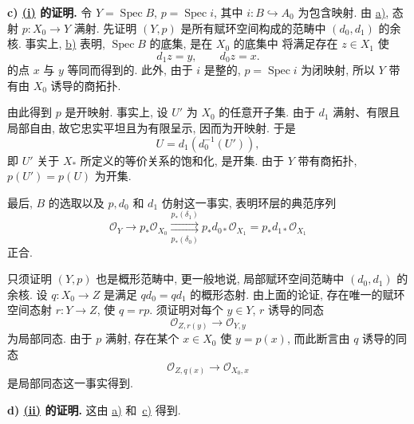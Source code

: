 
\medskip
{}\label{proof:sga3-V-4.1-c}%
\noindent\textbf{c) \hyperref[thm:sga3-V-4.1-i]{(i)} 的证明.}
令 \(Y=\operatorname{Spec}B\), \(p=\operatorname{Spec}i\),
其中 \(i:B\hookrightarrow A_0\) 为包含映射.
由 \hyperref[proof:sga3-V-4.1-a]{a)}, 态射 \(p:X_0\to Y\) 满射.
先证明 \((Y,p)\) 是所有赋环空间构成的范畴中 \((d_0,d_1)\) 的余核.
事实上, \hyperref[proof:sga3-V-4.1-b]{b)} 表明,
\(\operatorname{Spec}B\) 的底集, 是在 \(X_0\) 的底集中
将满足存在 \(z\in X_1\) 使
\[
  d_1z=y,\qquad d_0z=x.
\]
的点 \(x\) 与 \(y\) 等同而得到的.
此外, 由于 \(i\) 是整的, \(p=\operatorname{Spec}i\) 为闭映射,
所以 \(Y\) 带有由 \(X_0\) 诱导的商拓扑.

由此得到 \(p\) 是开映射. 事实上, 设 \(U'\) 为 \(X_0\) 的任意开子集.
由于 \(d_1\) 满射、有限且局部自由, 故它忠实平坦且为有限呈示,
因而为开映射. 于是
\[
  U=d_1\!\left(d_0^{-1}(U')\right),
\]
即 \(U'\) 关于 \(X_\ast\) 所定义的等价关系的饱和化, 是开集.
由于 \(Y\) 带有商拓扑, \(p(U')=p(U)\) 为开集.

最后, \(B\) 的选取以及 \(p,d_0\) 和 \(d_1\) 仿射这一事实,
表明环层的典范序列
\[
  \mathcal O_Y\longrightarrow p_\ast\mathcal O_{X_0}
  \underset{p_\ast(\delta_0)}{\overset{p_\ast(\delta_1)}
    {\rightrightarrows}}
  p_\ast d_{0\ast}\mathcal O_{X_1}
  =p_\ast d_{1\ast}\mathcal O_{X_1}
\]
正合.

只须证明 \((Y,p)\) 也是概形范畴中, 更一般地说,
局部赋环空间范畴中 \((d_0,d_1)\) 的余核.
设 \(q:X_0\to Z\) 是满足 \(qd_0=qd_1\) 的概形态射.
由上面的论证, 存在唯一的赋环空间态射 \(r:Y\to Z\), 使 \(q=rp\).
须证明对每个 \(y\in Y\), \(r\) 诱导的同态
\[
  \mathcal O_{Z,r(y)}\longrightarrow\mathcal O_{Y,y}
\]
为局部同态. 由于 \(p\) 满射, 存在某个 \(x\in X_0\) 使 \(y=p(x)\),
而此断言由 \(q\) 诱导的同态
\[
  \mathcal O_{Z,q(x)}\longrightarrow\mathcal O_{X_0,x}
\]
是局部同态这一事实得到.

\medskip
{}\label{proof:sga3-V-4.1-d}%
\noindent\textbf{d) \hyperref[thm:sga3-V-4.1-ii]{(ii)} 的证明.}
这由 \hyperref[proof:sga3-V-4.1-a]{a)} 和~\hyperref[proof:sga3-V-4.1-c]{c)} 得到.

